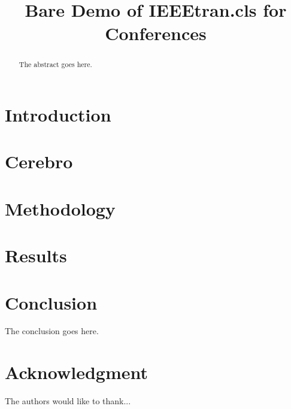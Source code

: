 \documentclass[conference,compsoc]{IEEEtran}
\begin{document}
%
\title{Bare Demo of IEEEtran.cls for Conferences}

\author{
}

\maketitle


\begin{abstract}
The abstract goes here.
\end{abstract}

\section{Introduction}
\label{sec:intro}


\section{Cerebro}
\label{sec:cerebro}


\section{Methodology}
\label{sec:methodology}


\section{Results}
\label{sec:results}


\section{Conclusion}
The conclusion goes here.

\section*{Acknowledgment}
The authors would like to thank...




\end{document}
